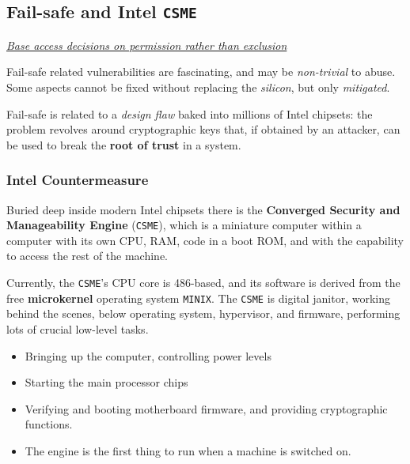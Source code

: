 \subsection{Fail-safe and Intel \texttt{CSME}}
\begin{center}
   \textit{\ul{Base access decisions on permission rather than
   exclusion}}
\end{center}
Fail-safe related vulnerabilities are fascinating, and may be \textit{non-trivial} to abuse.
Some aspects cannot be fixed without replacing the \textit{silicon}, but only \textit{mitigated}.

Fail-safe is related to a \textit{design flaw} baked into millions of Intel chipsets:
the problem revolves around cryptographic keys that, if obtained by an attacker,
can be used to break the \textbf{root of trust} in a system.

\subsubsection{Intel Countermeasure}
Buried deep inside modern Intel chipsets there is the \textbf{Converged
Security and Manageability Engine} (\texttt{CSME}),
which is a miniature computer within a computer with its own CPU, RAM, code in a boot ROM, and with the capability to access the rest of the machine.

Currently, the \texttt{CSME}'s CPU core is 486-based, and its software is
derived from the free \textbf{microkernel} operating system \texttt{MINIX}.
The \texttt{CSME} is digital janitor, working behind the scenes, below
operating system, hypervisor, and firmware, performing lots of
crucial low-level tasks.
\begin{itemize}
   \item Bringing up the computer, controlling power levels
   \item Starting the main processor chips
   \item Verifying and booting motherboard firmware, and providing
   cryptographic functions.
   \item The engine is the first thing to run when a machine is switched on.
\end{itemize}

